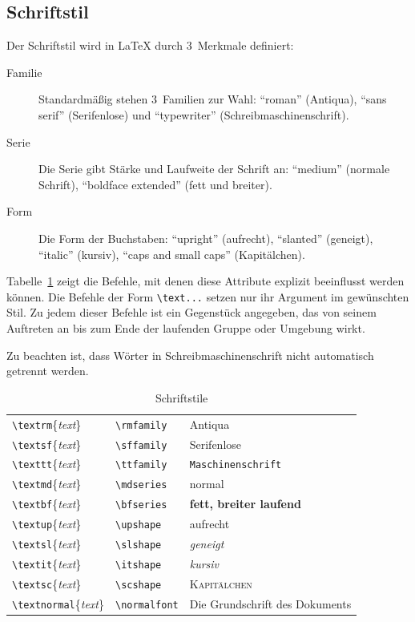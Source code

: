 \subsection{Schriftstil}
Der Schriftstil wird in \LaTeX{} durch 3~Merkmale definiert:
\begin{description}
\item[Familie] Standardmäßig stehen 3~Familien zur Wahl:
  "`roman"' (Antiqua), "`sans serif"' (Serifenlose) und "`typewriter"'
  (Schreibmaschinenschrift).
\item[Serie] Die Serie gibt Stärke und Laufweite der
  Schrift an: "`medium"' (normale Schrift), "`boldface extended"'
  (fett und breiter).
\item[Form] Die Form der Buchstaben: "`upright"'
  (aufrecht), "`slanted"' (geneigt), "`italic"' (kursiv),
  "`caps and small caps"' (Kapitälchen).
\end{description}
Tabelle~\ref{fonts} zeigt die Befehle, mit denen diese Attribute 
explizit beeinflusst werden können.  
Die Befehle der Form \lstinline|\text...| setzen nur ihr Argument im 
gewünschten  Stil.  Zu jedem dieser Befehle ist ein Gegenstück angegeben, 
das von seinem Auf\/treten an bis zum Ende der laufenden Gruppe oder Umgebung 
wirkt.

Zu beachten ist, dass Wörter in Schreibmaschinenschrift nicht automatisch
getrennt werden.\par

\begin{table}[hbp]
\caption{Schriftstile} \label{fonts}
\def\arraystretch{1.25}
\centering
\begin{tabular}{@{}lll@{}}
\toprule
\lstinline|\textrm|\{\textit{text}\}     &\lstinline|\rmfamily|   &\textrm{Antiqua}\\
\lstinline|\textsf|\{\textit{text}\}     &\lstinline|\sffamily|   &\textsf{Serifenlose}\\
\lstinline|\texttt|\{\textit{text}\}     &\lstinline|\ttfamily|   &\texttt{Maschinenschrift}\\
\lstinline|\textmd|\{\textit{text}\}     &\lstinline|\mdseries|   &\textmd{normal}\\
\lstinline|\textbf|\{\textit{text}\}     &\lstinline|\bfseries|   &\textbf{fett, breiter laufend}\\
\lstinline|\textup|\{\textit{text}\}     &\lstinline|\upshape|    &\textup{aufrecht}\\
\lstinline|\textsl|\{\textit{text}\}     &\lstinline|\slshape|    &\textsl{geneigt}\\
\lstinline|\textit|\{\textit{text}\}     &\lstinline|\itshape|    &\textit{kursiv}\\
\lstinline|\textsc|\{\textit{text}\}     &\lstinline|\scshape|    &\textsc{Kapitälchen}\\
\lstinline|\textnormal|\{\textit{text}\} &\lstinline|\normalfont| &\textnormal{Die Grundschrift des Dokuments}\\
\bottomrule
\end{tabular}
\end{table}

